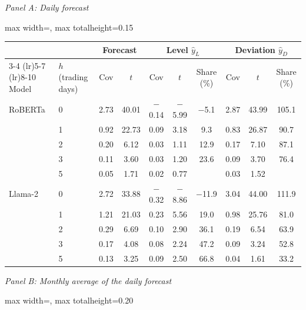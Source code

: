 \begin{table}[htbp]
{\footnotesize
\textit{Panel A: Daily forecast}\\[2pt]
\begin{adjustbox}{max width=\linewidth, max totalheight=0.15\textheight}
\begin{tabular}{llcccccccc}
\toprule
\multicolumn{2}{c}{} & \multicolumn{2}{c}{Forecast} & \multicolumn{3}{c}{Level $\hat y_L$} & \multicolumn{3}{c}{Deviation $\hat y_D$} \\
\cmidrule(lr){3-4} \cmidrule(lr){5-7} \cmidrule(lr){8-10}
Model & $h$ (trading days) & Cov & $t$ & Cov & $t$ & Share (\%) & Cov & $t$ & Share (\%) \\
\midrule
RoBERTa & 0 & 2.73 & 40.01 & $-$0.14 & $-$5.99 & \phantom{0}$-$5.1 & 2.87 & 43.99 & 105.1 \\
 & 1 & 0.92 & 22.73 & \phantom{$-$}0.09 & \phantom{$-$}3.18 & \phantom{$-$0}9.3 & 0.83 & 26.87 & \phantom{0}90.7 \\
 & 2 & 0.20 & \phantom{0}6.12 & \phantom{$-$}0.03 & \phantom{$-$}1.11 & \phantom{$-$}12.9 & 0.17 & \phantom{0}7.10 & \phantom{0}87.1 \\
 & 3 & 0.11 & \phantom{0}3.60 & \phantom{$-$}0.03 & \phantom{$-$}1.20 & \phantom{$-$}23.6 & 0.09 & \phantom{0}3.70 & \phantom{0}76.4 \\
 & 5 & 0.05 & \phantom{0}1.71 & \phantom{$-$}0.02 & \phantom{$-$}0.77 &  & 0.03 & \phantom{0}1.52 &  \\
\midrule
Llama-2 & 0 & 2.72 & 33.88 & $-$0.32 & $-$8.86 & $-$11.9 & 3.04 & 44.00 & 111.9 \\
 & 1 & 1.21 & 21.03 & \phantom{$-$}0.23 & \phantom{$-$}5.56 & \phantom{$-$}19.0 & 0.98 & 25.76 & \phantom{0}81.0 \\
 & 2 & 0.29 & \phantom{0}6.69 & \phantom{$-$}0.10 & \phantom{$-$}2.90 & \phantom{$-$}36.1 & 0.19 & \phantom{0}6.54 & \phantom{0}63.9 \\
 & 3 & 0.17 & \phantom{0}4.08 & \phantom{$-$}0.08 & \phantom{$-$}2.24 & \phantom{$-$}47.2 & 0.09 & \phantom{0}3.24 & \phantom{0}52.8 \\
 & 5 & 0.13 & \phantom{0}3.25 & \phantom{$-$}0.09 & \phantom{$-$}2.50 & \phantom{$-$}66.8 & 0.04 & \phantom{0}1.61 & \phantom{0}33.2 \\
\bottomrule
\end{tabular}
\end{adjustbox}
\par\medskip
\textit{Panel B: Monthly average of the daily forecast}\\[2pt]
\begin{adjustbox}{max width=\linewidth, max totalheight=0.20\textheight}

\end{adjustbox}}
\end{table}
